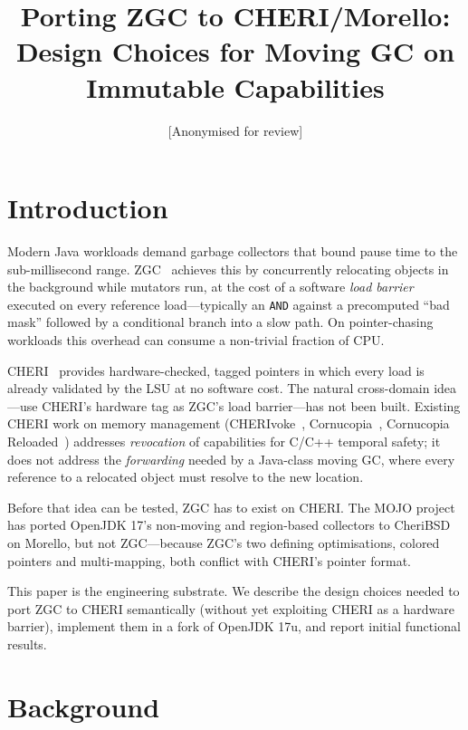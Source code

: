 \documentclass[acmsmall,nonacm]{acmart}
\title{Porting ZGC to CHERI/Morello: \\
       Design Choices for Moving GC on Immutable Capabilities}
\author{[Anonymised for review]}
\affiliation{\institution{[Anonymised]}\country{}}
\begin{document}
\maketitle

\section{Introduction}
\label{sec:intro}

Modern Java workloads demand garbage collectors that bound pause time to
the sub-millisecond range. ZGC~\cite{zgc-toplas} achieves this by
concurrently relocating objects in the background while mutators run, at
the cost of a software \emph{load barrier} executed on every reference
load—typically an \texttt{AND} against a precomputed ``bad mask''
followed by a conditional branch into a slow path. On pointer-chasing
workloads this overhead can consume a non-trivial fraction of CPU.

CHERI~\cite{cheri-isa-v9} provides hardware-checked, tagged pointers in
which every load is already validated by the LSU at no software cost.
The natural cross-domain idea—use CHERI's hardware tag as ZGC's load
barrier—has not been built. Existing CHERI work on memory management
(CHERIvoke~\cite{cherivoke}, Cornucopia~\cite{cornucopia}, Cornucopia
Reloaded~\cite{cornucopia-reloaded}) addresses \emph{revocation} of
capabilities for C/C++ temporal safety; it does not address the
\emph{forwarding} needed by a Java-class moving GC, where every
reference to a relocated object must resolve to the new location.

Before that idea can be tested, ZGC has to exist on CHERI. The MOJO
project~\cite{mojo-jvm} has ported OpenJDK 17's non-moving and
region-based collectors to CheriBSD on Morello, but not ZGC—because
ZGC's two defining optimisations, colored pointers and multi-mapping,
both conflict with CHERI's pointer format.

This paper is the engineering substrate. We describe the design
choices needed to port ZGC to CHERI semantically (without yet
exploiting CHERI as a hardware barrier), implement them in a fork of
OpenJDK 17u, and report initial functional results.

\section{Background}
\label{sec:bg}
\end{document}
